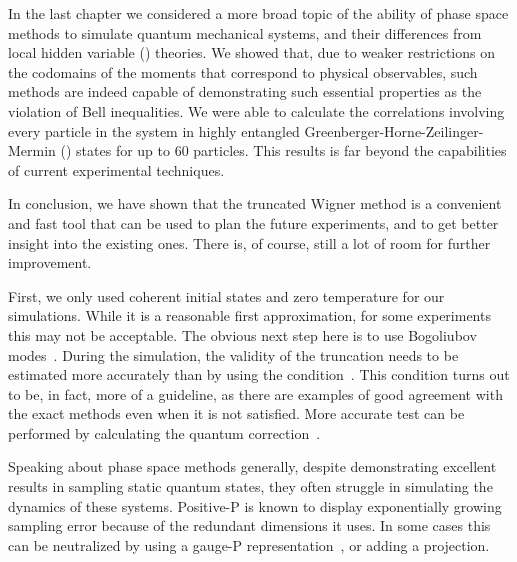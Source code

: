 In the last chapter we considered a more broad topic of the ability of phase space methods to simulate quantum mechanical systems, and their differences from local hidden variable () theories.
We showed that, due to weaker restrictions on the codomains of the moments that correspond to physical observables, such methods are indeed capable of demonstrating such essential  properties as the violation of Bell inequalities.
We were able to calculate the correlations involving every particle in the system in highly entangled Greenberger-Horne-Zeilinger-Mermin () states for up to 60 particles.
This results is far beyond the capabilities of current experimental techniques.

\centerline{\vfleuron}

In conclusion, we have shown that the truncated Wigner method is a convenient and fast tool that can be used to plan the future experiments, and to get better insight into the existing ones.
There is, of course, still a lot of room for further improvement.

First, we only used coherent initial states and zero temperature for our simulations.
While it is a reasonable first approximation, for some experiments this may not be acceptable.
The obvious next step here is to use Bogoliubov modes~\cite{Steel1998,Sinatra2002,Ruostekoski2005,Blakie2008}.
During the simulation, the validity of the truncation needs to be estimated more accurately than by using the condition~.
This condition turns out to be, in fact, more of a guideline, as there are examples of good agreement with the exact methods even when it is not satisfied.
More accurate test can be performed by calculating the quantum correction~\cite{Polkovnikov2010}.

Speaking about phase space methods generally, despite demonstrating excellent results in sampling static quantum states, they often struggle in simulating the dynamics of these systems.
Positive-P is known to display exponentially growing sampling error because of the redundant dimensions it uses.
In some cases this can be neutralized by using a gauge-P representation~\cite{Deuar2002,Deuar2005a}, or adding a projection.
